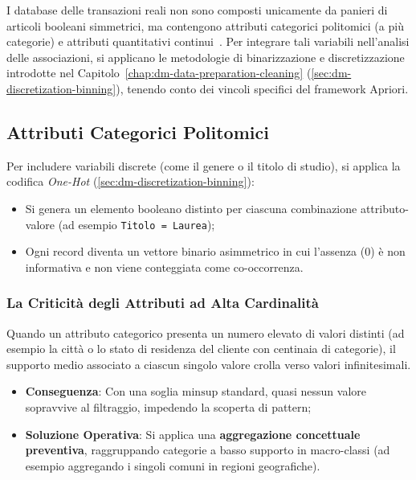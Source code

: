 I database delle transazioni reali non sono composti unicamente da panieri di articoli booleani simmetrici, ma contengono attributi categorici politomici (a più categorie) e attributi quantitativi continui~\cite{tan2018}. Per integrare tali variabili nell'analisi delle associazioni, si applicano le metodologie di binarizzazione e discretizzazione introdotte nel Capitolo~\ref{chap:dm-data-preparation-cleaning} (\autoref{sec:dm-discretization-binning}), tenendo conto dei vincoli specifici del framework Apriori.

\FloatBarrier
\subsection{Attributi Categorici Politomici}
Per includere variabili discrete (come il genere o il titolo di studio), si applica la codifica \textit{One-Hot} (\autoref{sec:dm-discretization-binning}):
\begin{itemize}
    \item Si genera un elemento booleano distinto per ciascuna combinazione attributo-valore (ad esempio \texttt{Titolo = Laurea});
    \item Ogni record diventa un vettore binario asimmetrico in cui l'assenza (0) è non informativa e non viene conteggiata come co-occorrenza.
\end{itemize}

\subsubsection{La Criticità degli Attributi ad Alta Cardinalità}
Quando un attributo categorico presenta un numero elevato di valori distinti (ad esempio la città o lo stato di residenza del cliente con centinaia di categorie), il supporto medio associato a ciascun singolo valore crolla verso valori infinitesimali.
\begin{itemize}
    \item \textbf{Conseguenza}: Con una soglia $\mathrm{minsup}$ standard, quasi nessun valore sopravvive al filtraggio, impedendo la scoperta di pattern;
    \item \textbf{Soluzione Operativa}: Si applica una \textbf{aggregazione concettuale preventiva}, raggruppando categorie a basso supporto in macro-classi (ad esempio aggregando i singoli comuni in regioni geografiche).
\end{itemize}

\FloatBarrier
